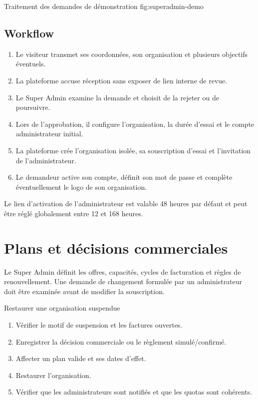   {Traitement des demandes de démonstration}
  {fig:superadmin-demo}

\subsection{Workflow}

\begin{enumerate}[leftmargin=*]
  \item Le visiteur transmet ses coordonnées, son organisation et plusieurs
  objectifs éventuels.
  \item La plateforme accuse réception sans exposer de lien interne de revue.
  \item Le Super Admin examine la demande et choisit de la rejeter ou de
  poursuivre.
  \item Lors de l'approbation, il configure l'organisation, la durée d'essai et
  le compte administrateur initial.
  \item La plateforme crée l'organisation isolée, sa souscription d'essai et
  l'invitation de l'administrateur.
  \item Le demandeur active son compte, définit son mot de passe et complète
  éventuellement le logo de son organisation.
\end{enumerate}

Le lien d'activation de l'administrateur est valable 48 heures par défaut et
peut être réglé globalement entre 12 et 168 heures.


\section{Plans et décisions commerciales}

Le Super Admin définit les offres, capacités, cycles de facturation et règles de
renouvellement. Une demande de changement formulée par un administrateur doit
être examinée avant de modifier la souscription.

\begin{procedurebox}{Restaurer une organisation suspendue}
  \begin{enumerate}[leftmargin=*]
    \item Vérifier le motif de suspension et les factures ouvertes.
    \item Enregistrer la décision commerciale ou le règlement simulé/confirmé.
    \item Affecter un plan valide et ses dates d'effet.
    \item Restaurer l'organisation.
    \item Vérifier que les administrateurs sont notifiés et que les quotas sont
    cohérents.
  \end{enumerate}
\end{procedurebox}

